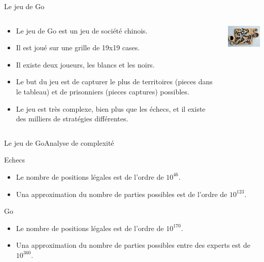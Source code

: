 \begin{frame}{Le jeu de Go}
    \begin{block}{}
        \begin{columns}
            \begin{column}{8cm}
                \begin{itemize}
                    \item Le jeu de Go est un jeu de société chinois.
                    \item Il est joué sur une grille de 19x19 cases.
                    \item Il existe deux joueurs, les blancs et les noirs.
                    \item Le but du jeu est de capturer le plus de territoires (pieces dans le tableau) et de prisonniers (pieces captures) possibles.
                    \item Le jeu est très complexe, bien plus que les échecs, et il existe des milliers de stratégies différentes.
                \end{itemize}
            \end{column}
            \begin{column}{3cm}
                \includegraphics[width=3cm]{ressources/Go_tableau}
            \end{column}
        \end{columns}
    \end{block}
\end{frame}


\begin{frame}{Le jeu de Go}{Analyse de complexité}
    \begin{block}{Echecs}
        \begin{itemize}
            \item Le nombre de positions légales est de l'ordre de $10^{46}$.
            \item Una approximation du nombre de parties possibles est de l'ordre de $10^{123}$.
        \end{itemize}
    \end{block}
    \begin{alertblock}{Go}
        \begin{itemize}
            \item Le nombre de positions légales est de l'ordre de $10^{170}$.
            \item Una approximation du nombre de parties possibles entre des experts est de $10^{360}$.
        \end{itemize}
    \end{alertblock}
\end{frame}


